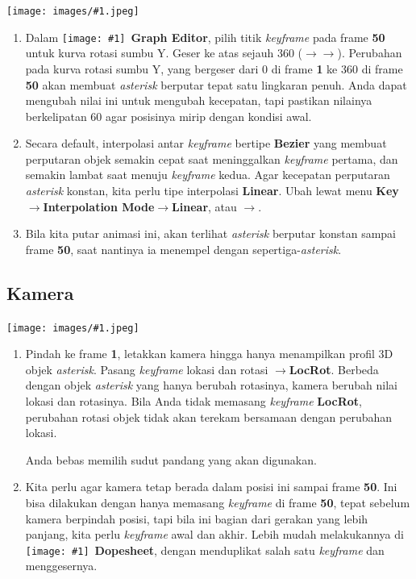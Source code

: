 \documentclass[11pt]{report}
\newcommand{\figL}[1]{
  \begingroup
  \centering
  \texttt{[image: images/\#1.jpeg]}
  \label{fig:#1}
  \endgroup
}
\def\iconwnd#1{\texttt{[image: \#1]}}
\def\fontwnd#1{{\bfseries#1}}
\def\wndDopesheet{
  \iconwnd{icons/wndDopesheet.jpeg}~\fontwnd{Dopesheet}}
\def\wndGraphEditor{
  \iconwnd{icons/wndGraphEditor.jpeg}~\fontwnd{Graph Editor}}
\def\key#1{\fbox{\bfseries\ttfamily#1}}
\def\ke{$\to$}
\begin{document}
\figL{logo-001}

\begin{enumerate}
\item Dalam \wndGraphEditor, pilih titik \textsl{keyframe} pada frame \textbf{50} untuk kurva rotasi sumbu Y. Geser ke atas sejauh 360 (\key{G}\ke\key{Y}\ke\key{``360''}). Perubahan pada kurva rotasi sumbu Y, yang bergeser dari 0 di frame \textbf{1} ke 360 di frame \textbf{50} akan membuat \textsl{asterisk} berputar tepat satu lingkaran penuh. Anda dapat mengubah nilai ini untuk mengubah kecepatan, tapi pastikan nilainya berkelipatan 60 agar posisinya mirip dengan kondisi awal.

\item Secara default, interpolasi antar \textsl{keyframe} bertipe \textbf{Bezier} yang membuat perputaran objek semakin cepat saat meninggalkan \textsl{keyframe} pertama, dan semakin lambat saat menuju \textsl{keyframe} kedua. Agar kecepatan perputaran \textsl{asterisk} konstan, kita perlu tipe interpolasi \textbf{Linear}. Ubah lewat menu \textbf{Key}\ke\textbf{Interpolation Mode}\ke\textbf{Linear}, atau \key{Shift-T}\ke\key{1}.

\item Bila kita putar animasi ini, akan terlihat \textsl{asterisk} berputar konstan sampai frame \textbf{50}, saat nantinya ia menempel dengan sepertiga-\textsl{asterisk}.
\end{enumerate}

\subsection{Kamera}

\figL{logo-002}

\begin{enumerate}
\item Pindah ke frame \textbf{1}, letakkan kamera hingga hanya menampilkan profil 3D objek \textsl{asterisk}. Pasang \textsl{keyframe} lokasi dan rotasi \key{I}\ke\textbf{LocRot}. Berbeda dengan objek \textsl{asterisk} yang hanya berubah rotasinya, kamera berubah nilai lokasi dan rotasinya. Bila Anda tidak memasang \textsl{keyframe} \textbf{LocRot}, perubahan rotasi objek tidak akan terekam bersamaan dengan perubahan lokasi.

  Anda bebas memilih sudut pandang yang akan digunakan.

\item Kita perlu agar kamera tetap berada dalam posisi ini sampai frame \textbf{50}. Ini bisa dilakukan dengan hanya memasang \textsl{keyframe} di frame \textbf{50}, tepat sebelum kamera berpindah posisi, tapi bila ini bagian dari gerakan yang lebih panjang, kita perlu \textsl{keyframe} awal dan akhir. Lebih mudah melakukannya di \wndDopesheet, dengan menduplikat \key{Shift-D} salah satu \textsl{keyframe} dan menggesernya.
\end{enumerate}
\end{document}
